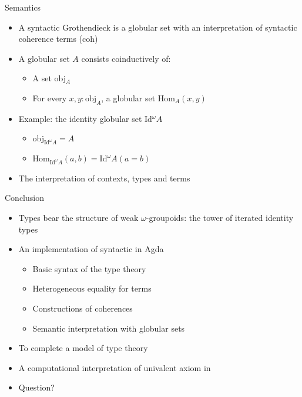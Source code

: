 \documentclass[12pt, mathserif,handout]{beamer}
\begin{document}
\begin{frame}{Semantics}

\begin{itemize}

\item A syntactic Grothendieck \wog is a globular set with an
  interpretation of syntactic coherence terms (coh)

\item A globular set $A$ consists coinductively of:
\begin{itemize}
\item A set obj$_{A}$
\item For every $x,y : \text{obj}_{A}$, a globular set Hom$_{A}(x, y)$
\end{itemize}

\item  Example: the identity globular set Id$^{\omega} A$
\begin{itemize}
\item obj$_{\text{Id}^{\omega} A} = A$
\item Hom$_{\text{Id}^{\omega} A}(a, b) = \text{Id}^{\omega} A (a = b)$
\end{itemize}

\item The interpretation of contexts, types and terms

\end{itemize}

\end{frame}











\begin{frame}{Conclusion}


\begin{itemize}

\item Types bear the structure of weak $\omega$-groupoids: the tower
  of iterated identity types

\item An implementation of syntactic \wog in Agda
  \begin{itemize}
  \item {Basic syntax of the type theory \tig}
  \item Heterogeneous equality for terms
  \item Constructions of coherences
  \item Semantic interpretation with globular sets
  \end{itemize}

\item To complete a \wogs model of type theory
\item A computational interpretation of univalent axiom in \itt


\item Question?
\end{itemize}


\end{frame}
\end{document}
